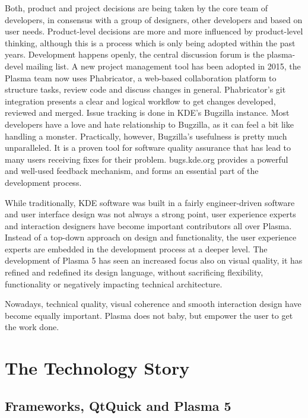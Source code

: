 Both, product and project decisions are being taken by the core team of developers, in consensus with a group of designers, other developers and based on user needs. Product-level decisions are more and more influenced by product-level thinking, although this is a process which is only being adopted within the past years.
Development happens openly, the central discussion forum is the plasma-devel mailing list. A new project management tool has been adopted in 2015, the Plasma team now uses Phabricator, a web-based collaboration platform to structure tasks, review code and discuss changes in general. Phabricator's git integration presents a clear and logical workflow to get changes developed, reviewed and merged.
Issue tracking is done in KDE's Bugzilla instance. Most developers have a love and hate relationship to Bugzilla, as it can feel a bit like handling a monster. Practically, however, Bugzilla's usefulness is pretty much unparalleled. It is a proven tool for software quality assurance that has lead to many users receiving fixes for their problem. bugs.kde.org provides a powerful and well-used feedback mechanism, and forms an essential part of the development process.

While traditionally, KDE software was built in a fairly engineer-driven software and user interface design was not always a strong point, user experience experts and interaction designers have become important contributors all over Plasma. Instead of a top-down approach on design and functionality, the user experience experts are embedded in the development process at a deeper level. The development of Plasma 5 has seen an increased focus also on visual quality, it has refined and redefined its design language, without sacrificing flexibility, functionality or negatively impacting technical architecture.

Nowadays, technical quality, visual coherence and smooth interaction design have become equally important. Plasma does not baby, but empower the user to get the work done.

\section*{The Technology Story}

\subsection*{Frameworks, QtQuick and Plasma 5}

